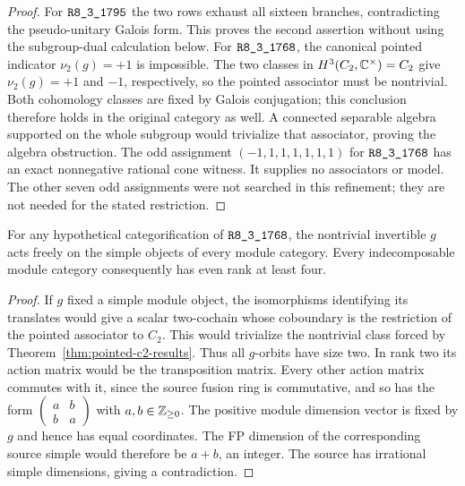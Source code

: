 \begin{proof}
For $\sha{R8_3_1795}$ the two rows exhaust all sixteen branches,
contradicting the pseudo-unitary Galois form.  This proves the second
assertion without using the subgroup-dual calculation below.
For $\sha{R8_3_1768}$, the canonical pointed indicator $\nu_2(g)=+1$
is impossible.  The two classes in $H^3(C_2,\mathbb C^\times)=C_2$ give
$\nu_2(g)=+1$ and $-1$, respectively, so the pointed associator must
be nontrivial.  Both cohomology classes are fixed by Galois conjugation;
this conclusion therefore holds in the original category as well.
A connected separable algebra supported on the whole subgroup would
trivialize that associator, proving the algebra obstruction.
The odd assignment $(-1,1,1,1,1,1,1)$ for $\sha{R8_3_1768}$ has an
exact nonnegative rational cone witness.  It supplies no associators
or model.  The other seven odd assignments were not searched in this
refinement; they are not needed for the stated restriction.
\end{proof}

\begin{corollary}
\label{cor:pointed-r1768-free-modules}
For any hypothetical categorification of $\sha{R8_3_1768}$, the
nontrivial invertible $g$ acts freely on the simple objects of every
module category.  Every indecomposable module category consequently
has even rank at least four.
\end{corollary}
\begin{proof}
If $g$ fixed a simple module object, the isomorphisms identifying its
translates would give a scalar two-cochain whose coboundary is the
restriction of the pointed associator to $C_2$.  This would trivialize
the nontrivial class forced by Theorem~\ref{thm:pointed-c2-results}.
Thus all $g$-orbits have size two.  In rank two its action matrix would
be the transposition matrix.  Every other action matrix commutes with
it, since the source fusion ring is commutative, and so has the form
$\left(\begin{smallmatrix}a&b\\b&a\end{smallmatrix}\right)$ with
$a,b\in\mathbb Z_{\ge0}$.  The positive module dimension vector is fixed by $g$
and hence has equal coordinates.  The FP dimension of the corresponding
source simple would therefore be $a+b$, an integer.  The source has
irrational simple dimensions, giving a contradiction.
\end{proof}

